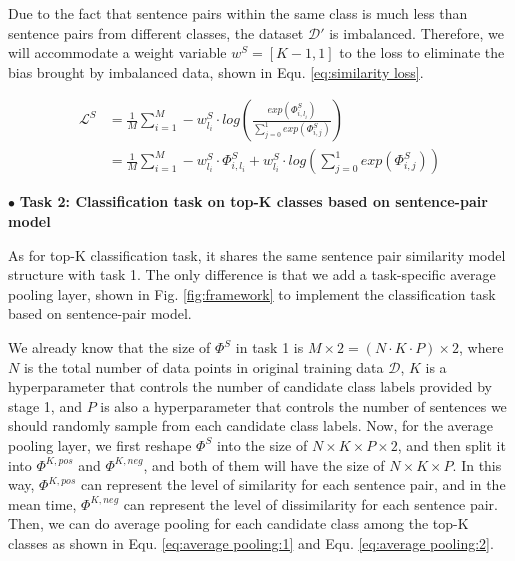 \documentclass[letterpaper]{article} %
\begin{document}
  Due  to  the  fact that sentence pairs within the same class is much less than
  sentence  pairs  from  different  classes,  the  dataset  $\mathcal{D'}$  is
  imbalanced.  Therefore, we will accommodate a weight variable $w^S = [K-1, 1]$
  to  the  loss  to eliminate the bias brought by imbalanced data, shown in Equ.
  \ref{eq:similarity loss}.

  \begin{equation}
    \begin{aligned}
      \mathcal{L}^{S}&=\frac{1}{M}\sum_{i=1}^{M}-w^S_{l_i}\cdot log(\frac{exp(\varPhi_{i,l_{i}}^S)}{\sum_{j=0}^{1}exp(\varPhi_{i,j}^S)}) \\&=\frac{1}{M}\sum_{i=1}^{M}-w^S_{l_i}\cdot \varPhi_{i,l_{i}}^S+w^S_{l_i}\cdot log(\sum_{j=0}^{1}exp(\varPhi_{i,j}^S))
      \label{eq:similarity loss}
    \end{aligned}
  \end{equation}

  $\bullet$ \textbf{Task 2: Classification task on top-K classes based on sentence-pair model}

  As  for top-K classification task, it shares the same sentence pair similarity
  model   structure  with  task  1.  The  only  difference  is  that  we  add  a
  task-specific  average  pooling  layer,  shown  in  Fig.  \ref{fig:framework} to
  implement the classification task based on sentence-pair model.

  We  already  know  that the size of ${\Phi}^S$ in task 1 is $M\times 2=(N\cdot
  K\cdot  P)\times  2$, where $N$ is the total number of data points in original
  training  data $\mathcal{D}$, $K$ is a hyperparameter that controls the number
  of   candidate   class  labels  provided  by  stage  1,  and  $P$  is  also  a
  hyperparameter that controls the number of sentences we should randomly sample
  from each candidate class labels. Now, for the average pooling layer, we first
  reshape  ${\Phi}^S$  into  the  size  of $N\times K\times P\times 2$, and then
  split  it  into  ${\Phi}^{K,pos}$  and ${\Phi}^{K,neg}$, and both of them will
  have  the  size  of  $N\times  K\times  P$.  In this way, ${\Phi}^{K,pos}$ can
  represent  the  level  of  similarity  for each sentence pair, and in the mean
  time,  ${\Phi}^{K,neg}$  can  represent  the  level  of dissimilarity for each
  sentence  pair. Then, we can do average pooling for each candidate class among
  the  top-K  classes  as  shown  in  Equ.  \ref{eq:average  pooling:1} and Equ.
  \ref{eq:average pooling:2}.
\end{document}
